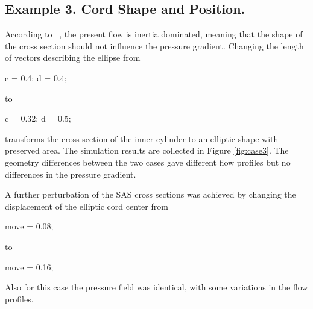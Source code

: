 \subsection{Example 3. Cord Shape and Position.}

According to ~\cite{Lopes2007,Alperin2006}, the present flow is inertia dominated, meaning that the shape of the cross section should not influence the pressure gradient. Changing the length of vectors describing the ellipse from
\begin{code}
c = 0.4;
d = 0.4;
\end{code}
to
\begin{code}
c = 0.32;
d = 0.5;
\end{code}
transforms the cross section of the inner cylinder to an elliptic shape with preserved area. The simulation results are collected in Figure \ref{fig:case3}. The geometry differences between the two cases gave different flow profiles but no differences in the pressure gradient.


A further perturbation of the SAS cross sections was achieved by changing the displacement of the elliptic cord center from
\begin{code}
move = 0.08;
\end{code}
to
\begin{code}
move = 0.16;
\end{code}
Also for this case the pressure field was identical, with some variations in the flow profiles.



